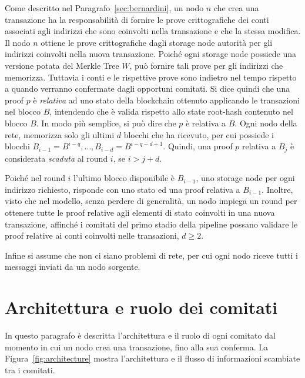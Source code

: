 Come descritto nel Paragrafo~\ref{sec:bernardini}, un nodo $n$ che crea una transazione ha la responsabilità di fornire le prove crittografiche dei conti associati agli indirizzi che sono coinvolti nella transazione e che la stessa modifica. Il nodo $n$ ottiene le prove crittografiche dagli storage node autorità per gli indirizzi coinvolti nella nuova transazione. Poiché ogni storage node possiede una versione potata del Merkle Tree $W$, può fornire tali prove per gli indirizzi che memorizza. Tuttavia i conti e le rispettive prove sono indietro nel tempo rispetto a quando verranno confermate dagli opportuni comitati. Si dice quindi che una proof $p$ è \emph{relativa} ad uno stato della blockchain ottenuto applicando le transazioni nel blocco $B$, intendendo che è valida rispetto allo state root-hash contenuto nel blocco $B$. In modo più semplice, si può dire che $p$ è relativa a $B$.
Ogni nodo della rete, memorizza solo gli ultimi $d$ blocchi che ha ricevuto, per cui possiede i blocchi $B_{i-1}=B^{i-q}, \dots, B_{i-d}=B^{i-q-d+1}$. Quindi, una proof $p$ relativa a $B_j$ è considerata \emph{scaduta} al round $i$, se $i > j + d$.

Poiché nel round $i$ l'ultimo blocco disponibile è $B_{i-1}$, uno storage node per ogni indirizzo richiesto, risponde con uno stato ed una proof relativa a $B_{i-1}$. Inoltre, visto che nel modello, senza perdere di generalità, un nodo impiega un round per ottenere tutte le proof relative agli elementi di stato coinvolti in una nuova transazione, affinché i comitati del primo stadio della pipeline possano validare le proof relative ai conti coinvolti nelle transazioni, $d \geq 2$.

Infine si assume che non ci siano problemi di rete, per cui ogni nodo riceve tutti i messaggi inviati da un nodo sorgente.

\section{Architettura e ruolo dei comitati}\label{sec:architettura}

In questo paragrafo è descritta l'architettura e il ruolo di ogni comitato dal momento in cui un nodo crea una transazione, fino alla sua conferma. La Figura~\ref{fig:architecture} mostra l'architettura e il flusso di informazioni scambiate tra i comitati.

